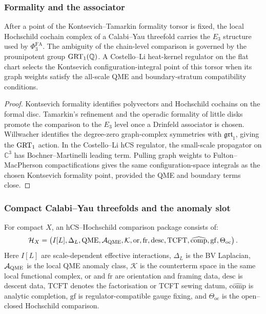 \subsubsection{Formality and the associator}
\label{wn:subsubsec:formality-associator}

\begin{theorem}
\label{thm:stage-one-formality-datum}
After a point of the Kontsevich--Tamarkin formality torsor is fixed, the
local Hochschild cochain complex of a Calabi--Yau threefold carries the
$E_3$ structure used by $\Phi^{\mathrm{FA}}_3$. The ambiguity of the
chain-level comparison is governed by the prounipotent group
$\mathrm{GRT}_1(\mathbb Q)$. A Costello--Li heat-kernel regulator on the flat
chart selects the Kontsevich configuration-integral point of this
torsor when its graph weights satisfy the all-scale QME and
boundary-stratum compatibility conditions.
\end{theorem}

\begin{proof}
Kontsevich formality identifies polyvectors and Hochschild cochains on
the formal disc. Tamarkin's refinement and the operadic formality of
little disks promote the comparison to the $E_3$ level once a Drinfeld
associator is chosen. Willwacher identifies the degree-zero graph-complex
symmetries with $\mathfrak{grt}_1$, giving the $\mathrm{GRT}_1$ action. In the
Costello--Li hCS regulator, the small-scale propagator on $\mathbb C^3$
has Bochner--Martinelli leading term. Pulling graph weights to
Fulton--MacPherson compactifications gives the same configuration-space
integrals as the chosen Kontsevich formality point, provided the QME and
boundary terms close.
\end{proof}

\subsubsection{Compact Calabi--Yau threefolds and the anomaly slot}
\label{wn:subsubsec:compact-cy3-anomaly-slot}

\begin{definition}
\label{def:compact-comparison-package}
For compact $X$, an hCS--Hochschild comparison package consists of:
\[
  \mathcal H_X =
  \left(
  I[L],\Delta_L,\mathrm{QME},\mathcal A_{\mathrm{QME}},
  \mathcal K,\mathrm{or},\mathrm{fr},\mathrm{desc},
  \mathrm{TCFT},\widehat{\mathrm{comp}},\mathrm{gf},
  \Theta_{\mathrm{oc}}
  \right).
\]
Here $I[L]$ are scale-dependent effective interactions, $\Delta_L$ is
the BV Laplacian, $\mathcal A_{\mathrm{QME}}$ is the local QME anomaly class,
$\mathcal K$ is the counterterm space in the same local functional
complex, $\mathrm{or}$ and $\mathrm{fr}$ are orientation and framing
data, $\mathrm{desc}$ is descent data, $\mathrm{TCFT}$ denotes the
factorisation or TCFT sewing datum, $\widehat{\mathrm{comp}}$ is
analytic completion, $\mathrm{gf}$ is regulator-compatible gauge
fixing, and $\Theta_{\mathrm{oc}}$ is the open--closed Hochschild
comparison.
\end{definition}

